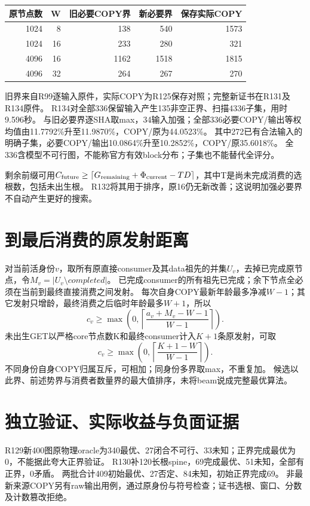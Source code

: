 \documentclass[UTF8,11pt,a4paper]{ctexart}
\begin{document}
\begin{center}
\begin{tabular}{rrrrr}
\toprule
原节点数&W&旧必要COPY界&新必要界&保存实际COPY\\
\midrule
1024&8&138&540&1573\\
1024&16&233&280&321\\
4096&16&1162&1518&1815\\
4096&32&264&267&270\\
\bottomrule
\end{tabular}
\end{center}
旧界来自R99逐输入原件，实际COPY为R125保存对照；完整新证书在R131及R134原件。
R134对全部336保留输入产生135非空正界、扫描4336子集，用时9.596秒。
与旧必要界逐SHA取max，34输入加强；全部336必要COPY/输出等权均值由11.7792\%升至11.9870\%，COPY/原为44.0523\%。
其中272已有合法输入的明确子集，必要COPY/输出10.0864\%升至10.2852\%，COPY/原35.6018\%。
全336含模型不可行图，不能称官方有效block分布；子集也不能替代全评分。

剩余前缀可用$C_{\rm future}\ge\lceil G_{\rm remaining}+\Phi_{\rm current}-TD\rceil$，其中T是尚未完成消费的选根数，包括未出生根。
R132将其用于排序，原16仍无新改善；这说明加强必要界不自动产生更好的搜索。

\section{到最后消费的原发射距离}
对当前活身份$v$，取所有原直接consumer及其data祖先的并集$U_v$，去掉已完成原节点，令$M_v=|U_v\setminus completed|$。
已完成consumer的所有祖先已完成；余下节点全必须在当前到最终直接消费之间发射。
每次自身COPY最新年龄最多净减$W-1$；其它发射只增龄，最终消费之后临时年龄最多$W+1$，所以
\[c_v\ge\max\left(0,\left\lceil\frac{a_v+M_v-W-1}{W-1}\right\rceil\right).\]
未出生GET以严格core节点数K和最终consumer计入$K+1$条原发射，可取
\[c_v\ge\max\left(0,\left\lceil\frac{K+1-W}{W-1}\right\rceil\right).\]
不同身份自身COPY归属互斥，可相加；同身份多界取max，不重复加。
候选以此界、前述势界与消费者数量界的最大值排序，未将beam说成完整最优算法。

\section{独立验证、实际收益与负面证据}
R129新400图原物理oracle为340最优、27闭合不可行、33未知；正界完成最优为0，不能据此夸大正界验证。
R130补120长根spine，69完成最优、51未知，全部有正界，0矛盾。
两批合计409初始最优、27否定、84未知，初始正界完成69。
非最新来源COPY另有raw输出用例，通过原身份与符号检查；证书选根、窗口、分数及计数篡改拒绝。
\end{document}
